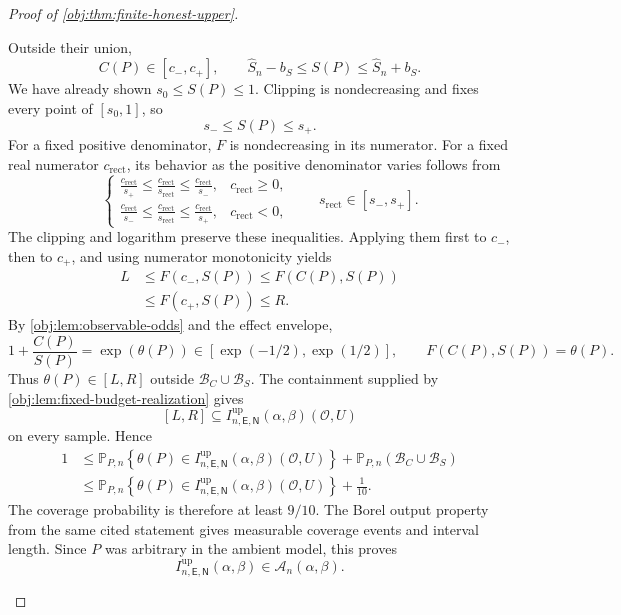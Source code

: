 \begin{proof}[Proof of \cref{obj:thm:finite-honest-upper}]
\begin{enumerate}
Outside their union,
\[
C(P)\in[c_-,c_+],
\qquad
\widehat S_n-b_S\le S(P)\le\widehat S_n+b_S.
\]
We have already shown \(s_0\le S(P)\le1\).
Clipping is nondecreasing and fixes every point of \([s_0,1]\), so
\[
s_-\le S(P)\le s_+.
\]
For a fixed positive denominator, \(F\) is nondecreasing in its numerator.
For a fixed real numerator \(c_{\mathrm{rect}}\), its behavior as the positive denominator varies follows from
\[
\begin{cases}
\displaystyle
\frac{c_{\mathrm{rect}}}{s_+}
\le\frac{c_{\mathrm{rect}}}{s_{\mathrm{rect}}}
\le\frac{c_{\mathrm{rect}}}{s_-},
& c_{\mathrm{rect}}\ge0,\\[6pt]
\displaystyle
\frac{c_{\mathrm{rect}}}{s_-}
\le\frac{c_{\mathrm{rect}}}{s_{\mathrm{rect}}}
\le\frac{c_{\mathrm{rect}}}{s_+},
& c_{\mathrm{rect}}<0,
\end{cases}
\qquad
s_{\mathrm{rect}}\in[s_-,s_+].
\]
The clipping and logarithm preserve these inequalities. Applying them first to \(c_-\), then to \(c_+\), and using numerator monotonicity yields
\[
\begin{aligned}
L
&\le F(c_-,S(P))
\le F(C(P),S(P))\\
&\le F(c_+,S(P))
\le R.
\end{aligned}
\]
By \cref{obj:lem:observable-odds} and the effect envelope,
\[
1+\frac{C(P)}{S(P)}
=\exp(\theta(P))
\in[\exp(-1/2),\exp(1/2)],
\qquad
F(C(P),S(P))=\theta(P).
\]
Thus \(\theta(P)\in[L,R]\) outside \(\mathcal B_C\cup\mathcal B_S\).
The containment supplied by \cref{obj:lem:fixed-budget-realization} gives
\[
[L,R]\subseteq
I^{\mathrm{up}}_{n,\mathsf E,\mathsf N}(\alpha,\beta)(\mathcal O,U)
\]
on every sample. Hence
\[
\begin{aligned}
1
&\le
\mathbb P_{P,n}
\left\{
\theta(P)\in
I^{\mathrm{up}}_{n,\mathsf E,\mathsf N}(\alpha,\beta)(\mathcal O,U)
\right\}
+\mathbb P_{P,n}(\mathcal B_C\cup\mathcal B_S)\\
&\le
\mathbb P_{P,n}
\left\{
\theta(P)\in
I^{\mathrm{up}}_{n,\mathsf E,\mathsf N}(\alpha,\beta)(\mathcal O,U)
\right\}
+\frac1{10}.
\end{aligned}
\]
The coverage probability is therefore at least \(9/10\).
The Borel output property from the same cited statement gives measurable coverage events and interval length. Since \(P\) was arbitrary in the ambient model, this proves
\[
I^{\mathrm{up}}_{n,\mathsf E,\mathsf N}(\alpha,\beta)
\in\mathcal A_n(\alpha,\beta).
\]


\end{enumerate}
\end{proof}
